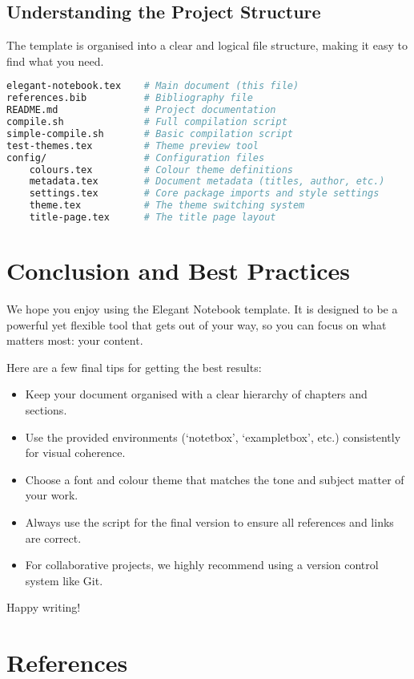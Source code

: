 \documentclass[a4paper,11pt]{report}
\begin{document}
\section{Understanding the Project Structure}
The template is organised into a clear and logical file structure, making it easy to find what you need.
\begin{lstlisting}[language=bash, caption={Project directory structure}, label={lst:structure}]
elegant-notebook.tex    # Main document (this file)
references.bib          # Bibliography file
README.md               # Project documentation
compile.sh              # Full compilation script
simple-compile.sh       # Basic compilation script
test-themes.tex         # Theme preview tool
config/                 # Configuration files
    colours.tex         # Colour theme definitions
    metadata.tex        # Document metadata (titles, author, etc.)
    settings.tex        # Core package imports and style settings
    theme.tex           # The theme switching system
    title-page.tex      # The title page layout
\end{lstlisting}

\chapter{Conclusion and Best Practices}
We hope you enjoy using the Elegant Notebook template. It is designed to be a powerful yet flexible tool that gets out of your way, so you can focus on what matters most: your content.

\begin{notetbox}
Here are a few final tips for getting the best results:
\begin{itemize}
    \item Keep your document organised with a clear hierarchy of chapters and sections.
    \item Use the provided environments (`notetbox', `exampletbox', etc.) consistently for visual coherence.
    \item Choose a font and colour theme that matches the tone and subject matter of your work.
    \item Always use the  script for the final version to ensure all references and links are correct.
    \item For collaborative projects, we highly recommend using a version control system like Git.
\end{itemize}
\end{notetbox}

Happy writing!

\chapter*{References}
\printbibliography[heading=none]
\end{document}

